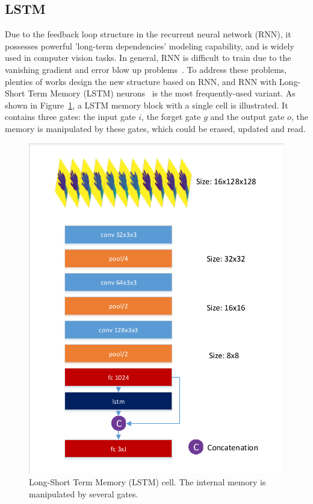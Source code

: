 \documentclass[journal,comsoc]{IEEEtran}
\let\MYoriglatexcaption\caption
\renewcommand{\caption}[2][\relax]{\MYoriglatexcaption[#2]{#2}}
\begin{document}
\subsection{LSTM}
Due to the feedback loop structure in the recurrent neural network (RNN), it possesses powerful 'long-term dependencies'
modeling capability, and is widely used in computer vision tasks. In general, RNN is difficult to train due to the vanishing
gradient and error blow up problems~\cite{graves2012supervised}. To address these problems, plenties of works design the new
structure based on RNN, and RNN with Long-Short Term Memory (LSTM) neurons~\cite{hochreiter1997long,zaremba2014learning} is the
most frequently-used variant. As shown in Figure~\ref{fig:lstm cell}, a LSTM memory block with a single cell is illustrated. 
It contains three gates: the input gate $i$, the forget gate $g$ and the output gate $o$, the memory is manipulated by these gates, 
which could be erased, updated and read.

\begin{figure}[htbp]
\centering
    \includegraphics[width=1\linewidth]{src/network/lstm.pdf}
    \caption{Long-Short Term Memory (LSTM) cell. The internal memory is manipulated by several gates.}
    \label{fig:lstm cell}
\end{figure}
\end{document}
